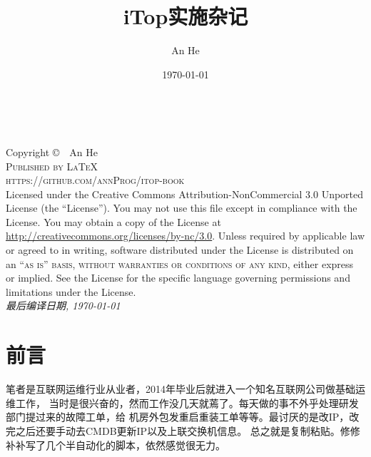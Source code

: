 \documentclass[fancyhdr,bookmark]{ctexbook}
\title{iTop实施杂记}
\author{An He}
\date{\today}
\begin{document}
\frontmatter

\begingroup
\thispagestyle{empty}
\vfill
\endgroup
{}

\newpage
~\vfill
\thispagestyle{empty}

\noindent Copyright \copyright\ \the\year\  An He\\ %

\noindent \textsc{Published by \LaTeX}\\ %
\noindent \textsc{https://github.com/annProg/itop-book}\\ %

\noindent Licensed under the Creative Commons Attribution-NonCommercial 3.0 Unported License (the ``License''). You may not use this file except in compliance with the License. You may obtain a copy of the License at \url{http://creativecommons.org/licenses/by-nc/3.0}. Unless required by applicable law or agreed to in writing, software distributed under the License is distributed on an \textsc{``as is'' basis, without warranties or conditions of any kind}, either express or implied. See the License for the specific language governing permissions and limitations under the License.\\ %

\noindent \textit{最后编译日期, \today\ \currenttime } %


    
\chapter*{前言}
笔者是互联网运维行业从业者，2014年毕业后就进入一个知名互联网公司做基础运维工作，
当时是很兴奋的，然而工作没几天就蔫了。每天做的事不外乎处理研发部门提过来的故障工单，给
机房外包发重启重装工单等等。最讨厌的是改IP，改完之后还要手动去CMDB更新IP以及上联交换机信息。
总之就是复制粘贴。修修补补写了几个半自动化的脚本，依然感觉很无力。
\end{document}
